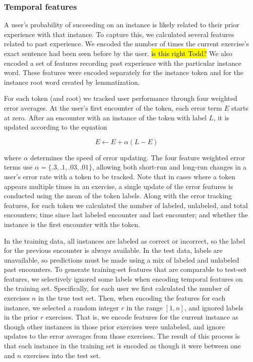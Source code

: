 \documentclass[11pt,a4paper]{article}
\begin{document}
\subsubsection{Temporal features}

A user's probability of succeeding on an instance is likely related to their
prior experience with that instance. To capture this, we calculated several
features related to past experience. We encoded the number of times the
current exercise's exact sentence had been seen before by the user. \hl{is this
  right Todd?} We also encoded a set of features recording past experience with
the particular instance word. These features were encoded separately for the
instance token and for the instance root word created by lemmatization.

For each token (and root) we tracked user performance through four weighted
error averages. At the user's first encounter of the token, each error term $E$ starts at
zero. After an encounter with an instance of the token with label $L$, it is
updated according to the equation

\[
E \leftarrow E + \alpha (L - E)
\]

where $\alpha$ determines the speed of error updating. The four feature weighted
error terms use $\alpha = \{.3, .1, .03, .01\}$, allowing both short-run and
long-run changes in a user's error rate with a token to be tracked. Note that in
cases where a token appears multiple times in an exercise, a single update of
the error features is conducted using the mean of the token labels.
Along with the error tracking features, for each token we calculated the number
of labeled, unlabeled, and total encounters; time since last labeled encounter and
last encounter; and whether the instance is the first encounter with the
token.

In the training data, all instances are labeled as correct or incorrect, so the
label for the previous encounter is always available. In the test data, labels
are unavailable, so predictions must be made using a mix of labeled and
unlabeled past encounters. To generate training-set features that are 
comparable to test-set features, we selectively ignored some labels when encoding temporal features on
the training set. Specifically, for each user we first calculated the number of
exercises $n$ in the true test set. Then, when encoding the features for each
instance, we selected a random integer $r$ in the range $[1,n]$, and ignored labels
in the prior $r$ exercises. That is, we encode features for the current instance
as though other instances in those prior exercises were unlabeled, and ignore
updates to the error averages from those exercises. The result of this process
is that each instance in the training set is encoded as though it were between
one and $n$ exercises into the test set.
\end{document}

